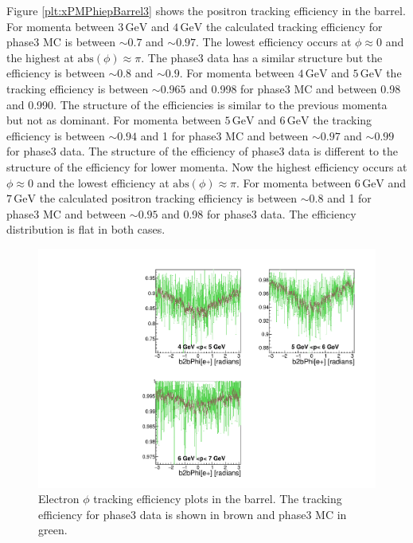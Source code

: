 \documentclass[a4paper,11pt,twosided,final,german,openbib,pdftex,listof=totoc,bibliography=totoc]{scrbook}
\begin{document}
Figure \ref{plt:xPMPhiepBarrel3} shows the positron tracking efficiency in the barrel. 
For momenta between $3\,\textrm{GeV}$ and $4\,\textrm{GeV}$ the calculated tracking efficiency for phase3 MC is between $\sim 0.7$ and $\sim 0.97$. The lowest efficiency  occurs at $\phi \approx 0$ and the highest at $\textrm{abs}(\phi) \approx \pi$. The phase3 data has a similar structure but the efficiency is between $\sim 0.8$ and $\sim 0.9$.
For momenta between $4\,\textrm{GeV}$ and $5\,\textrm{GeV}$ the tracking efficiency is between $\sim 0.965$ and 0.998 for phase3 MC and between 0.98 and 0.990. The structure of the efficiencies is similar to the previous momenta but not as dominant.
For momenta between $5\,\textrm{GeV}$ and $6\,\textrm{GeV}$ the tracking efficiency is between $\sim 0.94$ and 1 for phase3 MC and between $\sim 0.97$ and $\sim 0.99$ for phase3 data. The structure of the efficiency of phase3 data is different to the structure of the efficiency for lower momenta. Now the highest efficiency occurs at $\phi \approx 0$ and the lowest efficiency at $\textrm{abs}{(\phi)} \approx \pi$.
For momenta between $6\,\textrm{GeV}$ and $7\,\textrm{GeV}$ the calculated positron tracking efficiency is  between $\sim 0.8$ and 1 for phase3 MC and between $\sim 0.95$ and 0.98 for phase3 data. The efficiency distribution is flat in both cases.

\begin{figure}[!htbp]
	\centering
	\includegraphics[width=\textwidth]{Plots/master3/xPMPhiemBarrelP3}
	\caption[Momentum $\phi$ Electron Barrel Efficiency Phase3]{Electron $\phi$ tracking efficiency plots in the barrel. The tracking efficiency for phase3 data is shown in brown and phase3 MC in green.}
	\label{plt:xPMPhiemBarrel3}
\end{figure}
\end{document}
